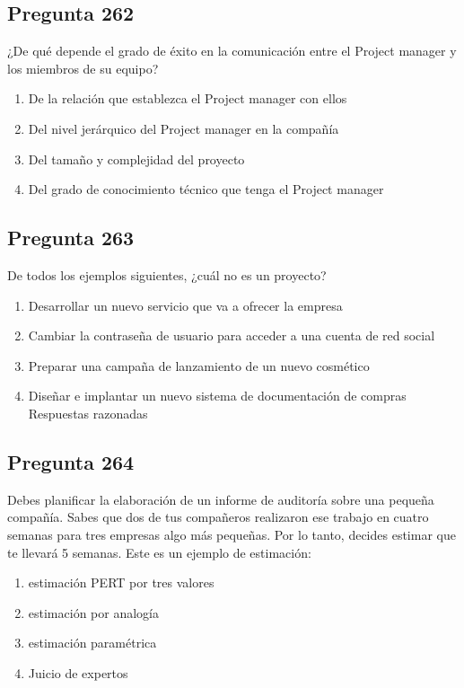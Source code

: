 \documentclass[11pt,a4paper]{article}
\begin{document}
\subsection*{Pregunta 262}
¿De qué depende el grado de éxito en la comunicación entre el Project manager y los miembros de su equipo?

\begin{enumerate}[label=\alph*)]
  \item De la relación que establezca el Project manager con ellos
  \item Del nivel jerárquico del Project manager en la compañía
  \item Del tamaño y complejidad del proyecto
  \item Del grado de conocimiento técnico que tenga el Project manager
\end{enumerate}

\subsection*{Pregunta 263}
De todos los ejemplos siguientes, ¿cuál no es un proyecto?

\begin{enumerate}[label=\alph*)]
  \item Desarrollar un nuevo servicio que va a ofrecer la empresa
  \item Cambiar la contraseña de usuario para acceder a una cuenta de red social
  \item Preparar una campaña de lanzamiento de un nuevo cosmético
  \item Diseñar e implantar un nuevo sistema de documentación de compras Respuestas razonadas
\end{enumerate}

\subsection*{Pregunta 264}
Debes planificar la elaboración de un informe de auditoría sobre una pequeña compañía. Sabes que dos de tus compañeros realizaron ese trabajo en cuatro semanas para tres empresas algo más pequeñas. Por lo tanto, decides estimar que te llevará 5 semanas. Este es un ejemplo de estimación:

\begin{enumerate}[label=\alph*)]
  \item estimación PERT por tres valores
  \item estimación por analogía
  \item estimación paramétrica
  \item Juicio de expertos
\end{enumerate}
\end{document}
